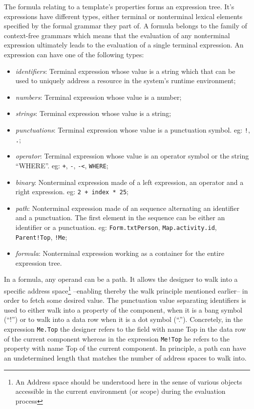 The formula relating to a template's properties forms an expression tree. It's expressions have different types, either terminal or nonterminal lexical elements specified by the formal grammar they part of. A formula belongs to the family of context-free grammars which means that the evaluation of any nonterminal expression ultimately leads to the evaluation of a single terminal expression. An expression can have one of the following types:
\begin{itemize}
    \item \emph{identifiers}: Terminal expression whose value is a string which that can be used to uniquely address a resource in the system's runtime environment;
    \item \emph{numbers}: Terminal expression whose value is a number;
    \item \emph{strings}: Terminal expression whose value is a string;
    \item \emph{punctuations}: Terminal expression whose value is a punctuation symbol. eg: \texttt{!}, \texttt{.};
    \item \emph{operator}: Terminal expression whose value is an operator symbol or the string ``WHERE''. eg: \texttt{+}, \texttt{-}, \texttt{-<}, \texttt{WHERE};
    \item \emph{binary}: Nonterminal expression made of a left expression, an operator and a right expression. eg: \texttt{2~+~index~*~25};
    \item \emph{path}: Nonterminal expression made of an sequence alternating an identifier and a punctuation. The first element in the sequence can be either an identifier or a punctuation. eg: \texttt{Form.txtPerson}, \texttt{Map.activity.id}, \texttt{Parent!Top}, \texttt{!Me};
    \item \emph{formula}: Nonterminal expression working as a container for the entire expression tree.
\end{itemize}

In a formula, any operand can be a path. It allows the designer to walk into a specific address space\footnote{An Address space should be understood here in the sense of various objects accessible in the current environment (or scope) during the evaluation process} --enabling thereby the walk principle mentioned earlier-- in order to fetch some desired value. The punctuation value separating identifiers is used to either walk into a property of the component, when it is a bang symbol (``!'') or to walk into a data row when it is a dot symbol (``.''). Concretely, in the expression \texttt{Me.Top} the designer refers to the field with name Top in the data row of the current component whereas in the expression \texttt{Me!Top} he refers to the property with name Top of the current component. In principle, a path can have an undetermined length that matches the number of address spaces to walk into.

